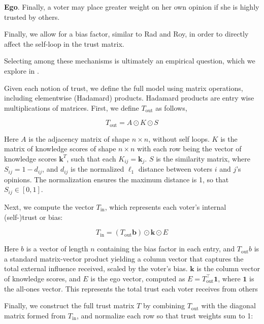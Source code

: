 \textbf{Ego}. Finally, a voter may place greater weight on her own opinion if
she is highly trusted by others.

Finally, we allow for a bias factor, similar to Rad and Roy, in order to
directly affect the self-loop in the trust matrix.

Selecting among these mechanisms is ultimately an empirical question, which we explore in .

Given each notion of trust, we define the full model using matrix operations,
including elementwise (Hadamard) products. Hadamard products are entry wise
multiplications of matrices. First, we define $T_{\text{out}}$ as follows,

\begin{equation}
	T_{\text{out}} = A \odot  K \odot S
	\label{eq:mat_out_trust}
\end{equation}

Here $A$ is the adjacency matrix of shape $n \times n$, without self loops. $K$
is the matrix of knowledge scores of shape $n \times n$ with each row being
the vector of knowledge scores $\boldsymbol{k}^T$, such that each $K_{ij} =
	\boldsymbol{k}_j$. $S$ is the similarity matrix, where $S_{ij} = 1 - d_{ij}$,
and $d_{ij}$ is the normalized $\ell_1$ distance between voters $i$ and $j$’s
opinions. The normalization ensures the maximum distance is 1, so that $S_{ij}
	\in [0, 1]$.

Next, we compute the vector $T_{\text{in}}$, which represents each voter’s internal (self-)trust or bias:

\begin{equation}
	T_{\text{in}} = (T_{\text{out}} \boldsymbol{b}) \odot \boldsymbol{k} \odot E
	\label{eq:in_trust}
\end{equation}

Here $b$ is a vector of length $n$ containing the bias factor in each entry,
and $T_{\text{out}} b$ is a standard matrix-vector product yielding a column
vector that captures the total external influence received, scaled by the
voter's bias. $\boldsymbol{k}$ is the column vector of knowledge scores, and
$E$ is the ego vector, computed as $E = T_{\text{out}}^\top
	\boldsymbol{1}$, where $\boldsymbol{1}$ is the all-ones vector. This represents
the total trust each voter receives from others


Finally, we construct the full trust matrix $T$ by combining $T_{\text{out}}$ with the diagonal matrix formed from $T_{\text{in}}$, and normalize each row so that trust weights sum to 1:


